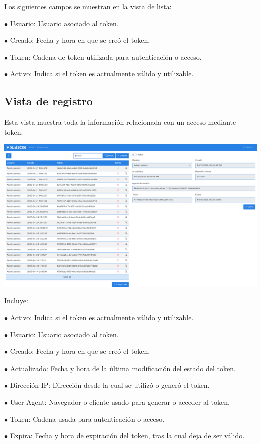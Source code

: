 \documentclass[a4paper]{article}
\begin{document}
Los siguientes campos se muestran en la vista de lista:

\begin{compactitem}
\item[\color{myblue}$\bullet$] Usuario: Usuario asociado al token.
\item[\color{myblue}$\bullet$] Creado: Fecha y hora en que se creó el token.
\item[\color{myblue}$\bullet$] Token: Cadena de token utilizada para autenticación o acceso.
\item[\color{myblue}$\bullet$] Activo: Indica si el token es actualmente válido y utilizable.
\end{compactitem}

\hypertarget{toc29}{}
\subsection{Vista de registro}

Esta vista muestra toda la información relacionada con un acceso mediante token.

\begin{center}\includegraphics[width=1\textwidth]{../ujest/snaps/test-screenshots-js-screenshots-common-tokenslog-view-1-es-es-1-snap.png}\end{center}

Incluye:

\begin{compactitem}
\item[\color{myblue}$\bullet$] Activo: Indica si el token es actualmente válido y utilizable.
\item[\color{myblue}$\bullet$] Usuario: Usuario asociado al token.
\item[\color{myblue}$\bullet$] Creado: Fecha y hora en que se creó el token.
\item[\color{myblue}$\bullet$] Actualizado: Fecha y hora de la última modificación del estado del token.
\item[\color{myblue}$\bullet$] Dirección IP: Dirección desde la cual se utilizó o generó el token.
\item[\color{myblue}$\bullet$] User Agent: Navegador o cliente usado para generar o acceder al token.
\item[\color{myblue}$\bullet$] Token: Cadena usada para autenticación o acceso.
\item[\color{myblue}$\bullet$] Expira: Fecha y hora de expiración del token, tras la cual deja de ser válido.
\end{compactitem}
\end{document}
